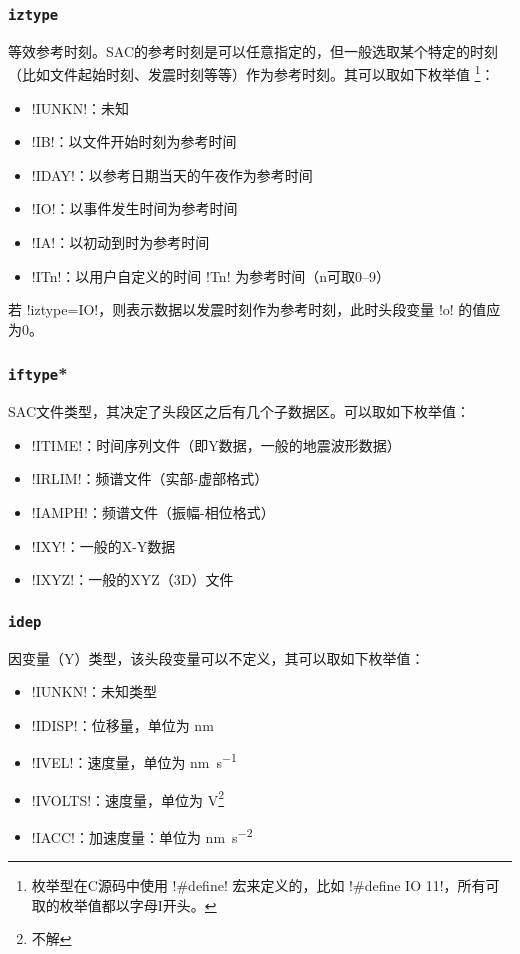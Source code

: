 \subsubsection{\texttt{iztype}}
等效参考时刻。SAC的参考时刻是可以任意指定的，但一般选取某个特定的时刻
（比如文件起始时刻、发震时刻等等）作为参考时刻。其可以取如下枚举值
\footnote{枚举型在C源码中使用 !#define! 宏来定义的，比如
!#define IO 11!，所有可取的枚举值都以字母I开头。}：
\begin{itemize}
\item !IUNKN!：未知
\item !IB!：以文件开始时刻为参考时间
\item !IDAY!：以参考日期当天的午夜作为参考时间
\item !IO!：以事件发生时间为参考时间
\item !IA!：以初动到时为参考时间
\item !ITn!：以用户自定义的时间 !Tn! 为参考时间（n可取0--9）
\end{itemize}

若 !iztype=IO!，则表示数据以发震时刻作为参考时刻，此时头段变量
!o! 的值应为0。

\subsubsection{\texttt{iftype}*}
SAC文件类型，其决定了头段区之后有几个子数据区。可以取如下枚举值：
\begin{itemize}
\item !ITIME!：时间序列文件（即Y数据，一般的地震波形数据）
\item !IRLIM!：频谱文件（实部-虚部格式）
\item !IAMPH!：频谱文件（振幅-相位格式）
\item !IXY!：一般的X-Y数据
\item !IXYZ!：一般的XYZ（3D）文件
\end{itemize}

\subsubsection{\texttt{idep}}
因变量（Y）类型，该头段变量可以不定义，其可以取如下枚举值：
\begin{itemize}
\item !IUNKN!：未知类型
\item !IDISP!：位移量，单位为 \si{\nm}
\item !IVEL!：速度量，单位为 \si{\nm\per\s}
\item !IVOLTS!：速度量，单位为 \si{\V}\footnote{不解}
\item !IACC!：加速度量：单位为 \si{\nm\per\square\s}
\end{itemize}

